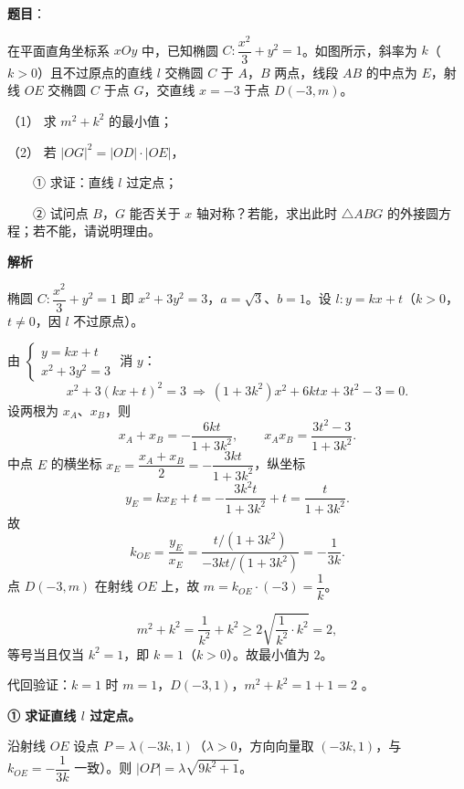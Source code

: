 \begin{answer}

\textbf{题目}：

在平面直角坐标系 $xOy$ 中，已知椭圆 $C:\dfrac{x^2}{3}+y^2=1$。如图所示，斜率为 $k$（$k>0$）且不过原点的直线 $l$ 交椭圆 $C$ 于 $A$，$B$ 两点，线段 $AB$ 的中点为 $E$，射线 $OE$ 交椭圆 $C$ 于点 $G$，交直线 $x=-3$ 于点 $D(-3,m)$。

（1） 求 $m^2+k^2$ 的最小值；

（2） 若 $|OG|^2=|OD|\cdot|OE|$，

　　① 求证：直线 $l$ 过定点；

　　② 试问点 $B$，$G$ 能否关于 $x$ 轴对称？若能，求出此时 $\triangle ABG$ 的外接圆方程；若不能，请说明理由。
\nopagebreak[4]
\begin{center}\end{center}
\nopagebreak[4]
\textbf{解析}

椭圆 $C:\dfrac{x^2}{3}+y^2=1$ 即 $x^2+3y^2=3$，$a=\sqrt3$、$b=1$。设 $l:y=kx+t$（$k>0$，$t\neq0$，因 $l$ 不过原点）。

由 $\begin{cases}y=kx+t\\ x^2+3y^2=3\end{cases}$ 消 $y$：
\nopagebreak[4]
\[
x^2+3(kx+t)^2=3\ \Longrightarrow\ (1+3k^2)x^2+6ktx+3t^2-3=0.
\]
设两根为 $x_A$、$x_B$，则
\nopagebreak[4]
\[
x_A+x_B=-\frac{6kt}{1+3k^2},\qquad x_Ax_B=\frac{3t^2-3}{1+3k^2}.
\]
中点 $E$ 的横坐标 $x_E=\dfrac{x_A+x_B}{2}=-\dfrac{3kt}{1+3k^2}$，纵坐标
\nopagebreak[4]
\[
y_E=kx_E+t=-\frac{3k^2t}{1+3k^2}+t=\frac{t}{1+3k^2}.
\]
故
\nopagebreak[4]
\[
k_{OE}=\frac{y_E}{x_E}=\frac{t/(1+3k^2)}{-3kt/(1+3k^2)}=-\frac{1}{3k}.
\]
点 $D(-3,m)$ 在射线 $OE$ 上，故 $m=k_{OE}\cdot(-3)=\dfrac1k$。


\nopagebreak[4]
\[
m^2+k^2=\frac{1}{k^2}+k^2\geqslant2\sqrt{\frac{1}{k^2}\cdot k^2}=2,
\]
等号当且仅当 $k^2=1$，即 $k=1$（$k>0$）。故最小值为 $2$。

代回验证：$k=1$ 时 $m=1$，$D(-3,1)$，$m^2+k^2=1+1=2$ 。


\textbf{① 求证直线 $l$ 过定点。}

沿射线 $OE$ 设点 $P=\lambda(-3k,1)$（$\lambda>0$，方向向量取 $(-3k,1)$，与 $k_{OE}=-\dfrac{1}{3k}$ 一致）。则 $|OP|=\lambda\sqrt{9k^2+1}$。


\end{answer}
